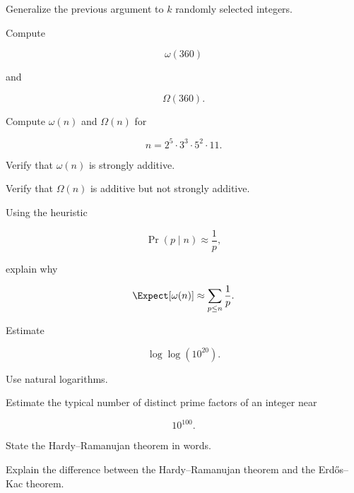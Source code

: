 \begin{exercise}[2]
Generalize the previous argument to \(k\) randomly selected integers.
\end{exercise}

\begin{exercise}[1]
Compute

\[ \omega(360) \]

and

\[ \Omega(360). \]
\end{exercise}

\begin{exercise}[1]
Compute \(\omega(n)\) and \(\Omega(n)\) for

\[ n=2^5\cdot3^3\cdot5^2\cdot11. \]
\end{exercise}

\begin{exercise}[2]
Verify that \(\omega(n)\) is strongly additive.
\end{exercise}

\begin{exercise}[2]
Verify that \(\Omega(n)\) is additive but not strongly additive.
\end{exercise}

\begin{exercise}[2]
Using the heuristic

\[ \Pr(p\mid n)\approx\frac1p, \]

explain why

\[ \Expect[\omega(n)]\approx\sum_{p\leq n}\frac1p. \]
\end{exercise}

\begin{exercise}[2]
Estimate

\[ \log\log(10^{20}). \]

Use natural logarithms.
\end{exercise}

\begin{exercise}[2]
Estimate the typical number of distinct prime factors of an integer near

\[ 10^{100}. \]
\end{exercise}

\begin{exercise}[2]
State the Hardy--Ramanujan theorem in words.
\end{exercise}

\begin{exercise}[2]
Explain the difference between the Hardy--Ramanujan theorem and the
Erdős--Kac theorem.
\end{exercise}

